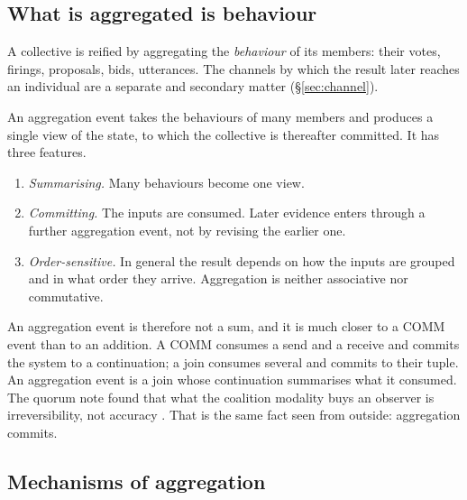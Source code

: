 \documentclass[11pt,a4paper]{article}
\begin{document}
\subsection{What is aggregated is behaviour}

A collective is reified by aggregating the \emph{behaviour} of its members: their votes, firings,
proposals, bids, utterances. The channels by which the result later reaches an individual are a
separate and secondary matter (\S\ref{sec:channel}).

\begin{definition}\label{def:aggregation}
An aggregation event takes the behaviours of many members and produces a single view of the state,
to which the collective is thereafter committed. It has three features.
\begin{enumerate}[label=(\roman*),itemsep=1pt]
\item \emph{Summarising.} Many behaviours become one view.
\item \emph{Committing.} The inputs are consumed. Later evidence enters through a further
  aggregation event, not by revising the earlier one.
\item \emph{Order-sensitive.} In general the result depends on how the inputs are grouped and in
  what order they arrive. Aggregation is neither associative nor commutative.
\end{enumerate}
\end{definition}

An aggregation event is therefore not a sum, and it is much closer to a COMM event than to an
addition. A COMM consumes a send and a receive and commits the system to a continuation; a join
consumes several and commits to their tuple. An aggregation event is a join whose continuation
summarises what it consumed. The quorum note found that what the coalition modality buys an
observer is irreversibility, not accuracy \cite{herd-note}. That is the same fact seen from
outside: aggregation commits.

\subsection{Mechanisms of aggregation}
\end{document}
